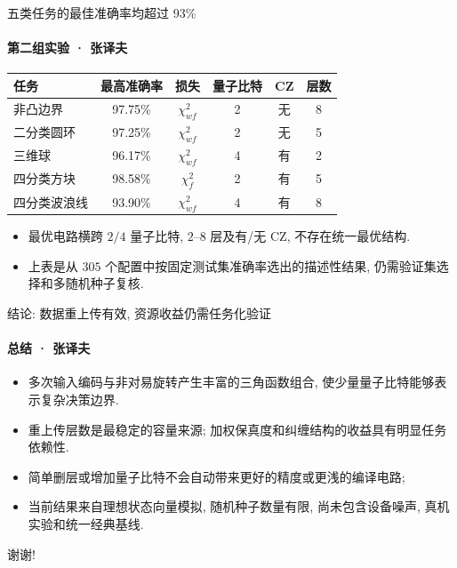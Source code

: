 \documentclass{ctexbeamer}
\begin{document}
\begin{frame}{五类任务的最佳准确率均超过 93\%}
    \framesubtitle{第二组实验 · 张译夫}
    \begin{table}
        \centering
        \small
        \renewcommand{\arraystretch}{1.25}
        \begin{tabular}{lccccc}
            \toprule
            任务 & 最高准确率 & 损失 & 量子比特 & CZ & 层数 \\
            \midrule
            非凸边界 & 97.75\% & $\chi_{wf}^2$ & 2 & 无 & 8 \\
            二分类圆环 & 97.25\% & $\chi_{wf}^2$ & 2 & 无 & 5 \\
            三维球 & 96.17\% & $\chi_{wf}^2$ & 4 & 有 & 2 \\
            四分类方块 & 98.58\% & $\chi_f^2$ & 2 & 有 & 5 \\
            四分类波浪线 & 93.90\% & $\chi_{wf}^2$ & 4 & 有 & 8 \\
            \bottomrule
        \end{tabular}
    \end{table}
    \begin{itemize}
        \setlength{\itemsep}{0.7ex}
        \item 最优电路横跨 $2/4$ 量子比特, $2$--$8$ 层及有/无 CZ, 不存在统一最优结构.
        \item 上表是从 $305$ 个配置中按固定测试集准确率选出的描述性结果, 仍需验证集选择和多随机种子复核.
    \end{itemize}
\end{frame}

\begin{frame}{结论: 数据重上传有效, 资源收益仍需任务化验证}
    \framesubtitle{总结 · 张译夫}
    \begin{itemize}
        \setlength{\itemsep}{1.1ex}
        \item 多次输入编码与非对易旋转产生丰富的三角函数组合, 使少量量子比特能够表示复杂决策边界.
        \item 重上传层数是最稳定的容量来源; 加权保真度和纠缠结构的收益具有明显任务依赖性.
        \item 简单删层或增加量子比特不会自动带来更好的精度或更浅的编译电路; 
        \item 当前结果来自理想状态向量模拟, 随机种子数量有限, 尚未包含设备噪声, 真机实验和统一经典基线.
    \end{itemize}
\end{frame}

\begin{frame}
    \centering
    \Huge \textcolor{structure}{谢谢!}
\end{frame}
\end{document}
